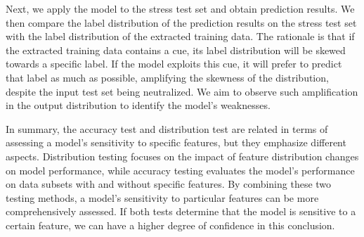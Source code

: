 Next, we apply the model to the stress test set 
and obtain prediction results. We then compare 
the label distribution of the prediction results 
on the stress test set with the label distribution 
of the extracted training data. The rationale is 
that if the extracted training data contains a cue, 
its label distribution will be skewed towards a specific label. 
If the model exploits this cue, it will prefer to predict that 
label as much as possible, amplifying the skewness of the distribution, 
despite the input test set being neutralized. 
We aim to observe such amplification in the 
output distribution to identify the model's weaknesses.

In summary, the accuracy test and distribution test are 
related in terms of assessing a model's sensitivity to 
specific features, but they emphasize different aspects. 
Distribution testing focuses on the impact of feature 
distribution changes on model performance, while accuracy 
testing evaluates the model's performance on data subsets 
with and without specific features. By combining these 
two testing methods, a model's sensitivity to particular 
features can be more comprehensively assessed. 
If both tests determine that the model is sensitive to 
a certain feature, we can have a higher degree of confidence in this conclusion.
